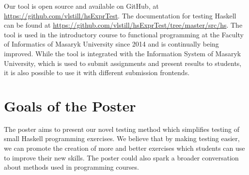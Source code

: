 \documentclass[sigconf,screen]{acmart} %
\begin{document}
Our tool is open source and available on GitHub, at
\url{https://github.com/vlstill/hsExprTest}.
The documentation for testing Haskell can be found at
\url{https://github.com/vlstill/hsExprTest/tree/master/src/hs}.
The tool is used in the introductory course to functional programming at the
Faculty of Informatics of Masaryk University since 2014 and is continually
being improved.
While the tool is integrated with the Information System of Masaryk University,
which is used to submit assignments and present results to students, it is also
possible to use it with different submission frontends.

\section{Goals of the Poster}

The poster aims to present our novel testing method which simplifies testing of
small Haskell programming exercises.
We believe that by making testing easier, we can promote the creation of more
and better exercises which students can use to improve their new skills.
The poster could also spark a broader conversation about methods used in
programming courses.

\balance


\end{document}
